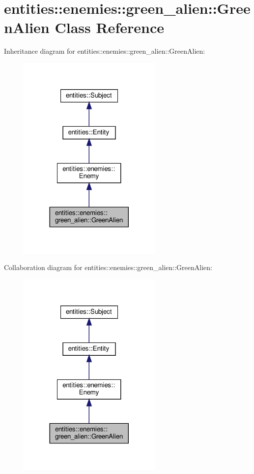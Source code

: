 \hypertarget{classentities_1_1enemies_1_1green__alien_1_1GreenAlien}{}\section{entities\+:\+:enemies\+:\+:green\+\_\+alien\+:\+:Green\+Alien Class Reference}
\label{classentities_1_1enemies_1_1green__alien_1_1GreenAlien}


Inheritance diagram for entities\+:\+:enemies\+:\+:green\+\_\+alien\+:\+:Green\+Alien\+:\nopagebreak
\begin{figure}[H]
\begin{center}
\leavevmode
\includegraphics[width=200pt]{classentities_1_1enemies_1_1green__alien_1_1GreenAlien__inherit__graph}
\end{center}
\end{figure}


Collaboration diagram for entities\+:\+:enemies\+:\+:green\+\_\+alien\+:\+:Green\+Alien\+:\nopagebreak
\begin{figure}[H]
\begin{center}
\leavevmode
\includegraphics[width=200pt]{classentities_1_1enemies_1_1green__alien_1_1GreenAlien__coll__graph}
\end{center}
\end{figure}
